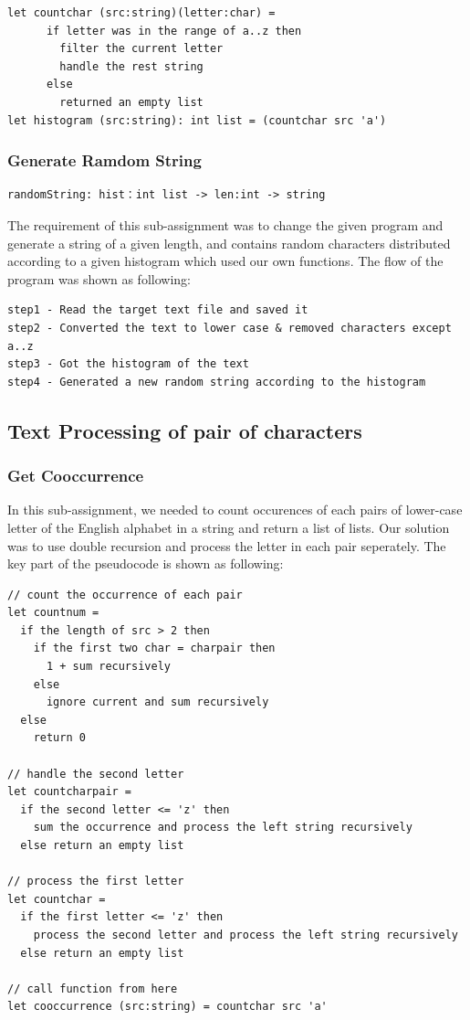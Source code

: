 \documentclass{article}
\begin{document}
\begin{lstlisting}
let countchar (src:string)(letter:char) = 
      if letter was in the range of a..z then 
        filter the current letter
        handle the rest string
      else
        returned an empty list
let histogram (src:string): int list = (countchar src 'a')
\end{lstlisting}

\subsubsection{Generate Ramdom String}
\begin{lstlisting}
randomString: hist：int list -> len:int -> string
\end{lstlisting}

The requirement of this sub-assignment was to change the given program and generate a string of a given length, and contains random characters distributed according to a given histogram which used our own functions. The flow of the program was shown as following:

\begin{lstlisting}
step1 - Read the target text file and saved it
step2 - Converted the text to lower case & removed characters except a..z
step3 - Got the histogram of the text
step4 - Generated a new random string according to the histogram
\end{lstlisting}

\subsection{Text Processing of pair of characters}

\subsubsection{Get Cooccurrence}

In this sub-assignment, we needed to count occurences of each pairs of lower-case letter of the English alphabet in a string and return a list of lists. Our solution was to use double recursion and process the letter in each pair seperately. The key part of the pseudocode is shown as following:

\begin{lstlisting}
// count the occurrence of each pair
let countnum = 
  if the length of src > 2 then
    if the first two char = charpair then
      1 + sum recursively
    else
      ignore current and sum recursively
  else
    return 0      

// handle the second letter    
let countcharpair = 
  if the second letter <= 'z' then
    sum the occurrence and process the left string recursively
  else return an empty list   

// process the first letter
let countchar = 
  if the first letter <= 'z' then
    process the second letter and process the left string recursively
  else return an empty list    

// call function from here
let cooccurrence (src:string) = countchar src 'a'
\end{lstlisting}
\end{document}
